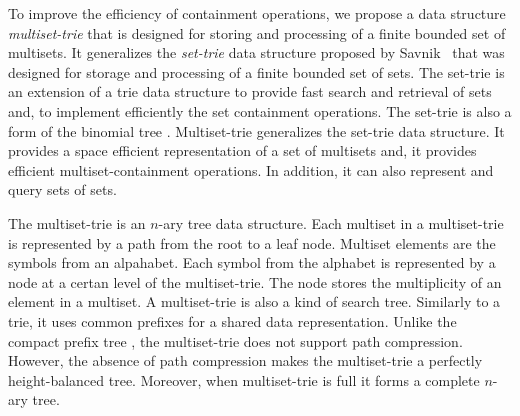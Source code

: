 %
%
To improve the efficiency of containment operations, we propose a data structure \emph{multiset-trie} that is designed for storing and processing of a finite bounded set of multisets. It generalizes the \emph{set-trie} data structure proposed by Savnik~\cite{savnik2013index} that was designed for storage and processing of a finite bounded set of sets. 
%
The set-trie is an extension of a trie data structure to provide fast search and retrieval of sets and, to implement efficiently the set containment operations. The set-trie is also a form of the binomial tree \cite{corman2001}. Multiset-trie generalizes the set-trie data structure. It provides a space efficient representation of a set of multisets and, it provides efficient multiset-containment operations. In addition, it can also represent and query sets of sets.

The multiset-trie is an $n$-ary tree data structure. Each multiset in a multiset-trie is represented by a path from the root to a leaf node. Multiset elements are the symbols from an alpahabet. Each symbol from the alphabet is represented by a node at a certan level of the multiset-trie. The node stores the multiplicity of an element in a multiset.
%
%
A multiset-trie is also a kind of search tree. Similarly to a trie, it uses common prefixes for a shared data representation. Unlike the compact prefix tree \cite{Sedgewick:2011:ALG:2011916}, the multiset-trie does not support path compression. However, the absence of path compression makes the multiset-trie a perfectly height-balanced tree. Moreover, when multiset-trie is full it forms a complete $n$-ary tree.
%

% 
%
